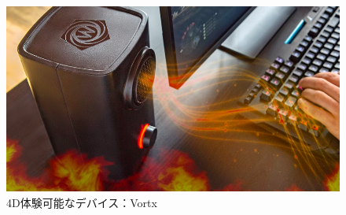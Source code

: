 \begin{figure}[H]
  \centering
  \includegraphics[width=15cm]{images/chapter2/vortx.png}
  \caption{4D体験可能なデバイス：Vortx}
  \label{vortx}
\end{figure}